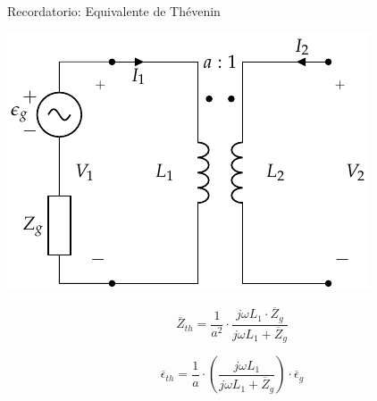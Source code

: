 \documentclass[xcolor={usenames,svgnames,dvipsnames}]{beamer}
\begin{document}
\begin{frame}[label={sec:org39a62a1}]{Recordatorio: Equivalente de Thévenin}
\begin{center}
\includegraphics[height=0.5\textheight]{../figs/Trafo_Perfecto_FuentePrimario.pdf}
\end{center}

\[
  \overline{Z}_{th} = \frac{1}{a^2} \cdot \frac{j \omega L_1 \cdot \overline{Z}_g}{j\omega L_1 + \overline{Z}_g}
\]

\[
  \overline{\epsilon}_{th} = \frac{1}{a} \cdot \left(\frac{j\omega L_1}{j\omega L_1 + \overline{Z}_g}\right) \cdot \overline{\epsilon}_g
\]
\end{frame}
\end{document}

